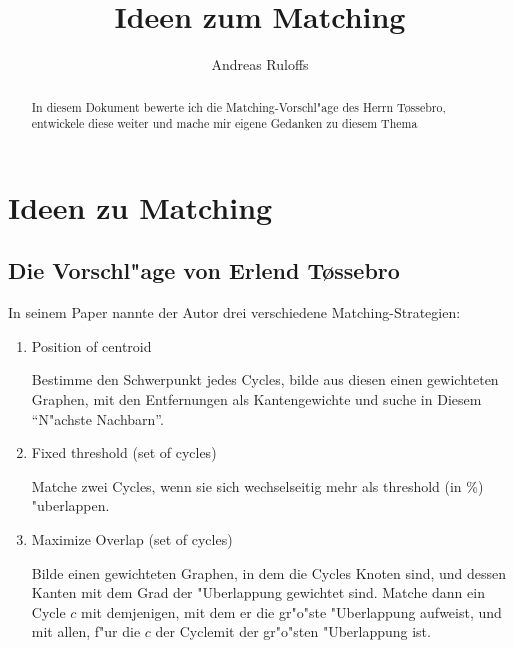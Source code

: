 \documentclass[a4paper,10pt,twoside]{scrreprt}
\title{Ideen zum Matching}
\author{Andreas Ruloffs}
\begin{document}
\maketitle

\begin{abstract}
In diesem Dokument bewerte ich die Matching-Vorschl"age des Herrn T\o{}ssebro, entwickele diese weiter und mache mir eigene Gedanken zu diesem Thema
\end{abstract}
\tableofcontents
\chapter{Ideen zu Matching}

\section{Die Vorschl"age von Erlend T\o{}ssebro}
In seinem Paper nannte der Autor drei verschiedene Matching-Strategien:
\begin{enumerate}
\item Position of centroid

Bestimme den Schwerpunkt jedes Cycles,  bilde aus diesen einen gewichteten Graphen, mit den Entfernungen als Kantengewichte und suche in Diesem "`N"achste Nachbarn"'.
\item Fixed threshold (set of cycles)

Matche zwei Cycles, wenn sie sich wechselseitig  mehr als threshold (in \%) "uberlappen.

\item Maximize Overlap (set of cycles)

Bilde einen gewichteten Graphen, in dem die Cycles Knoten sind, und dessen Kanten mit dem Grad der "Uberlappung gewichtet sind. Matche dann ein Cycle $c$ mit demjenigen, mit dem er die gr"o"ste "Uberlappung aufweist, und mit allen, f"ur die $c$ der Cyclemit der gr"o"sten "Uberlappung ist.
\end{enumerate} 
\end{document}
